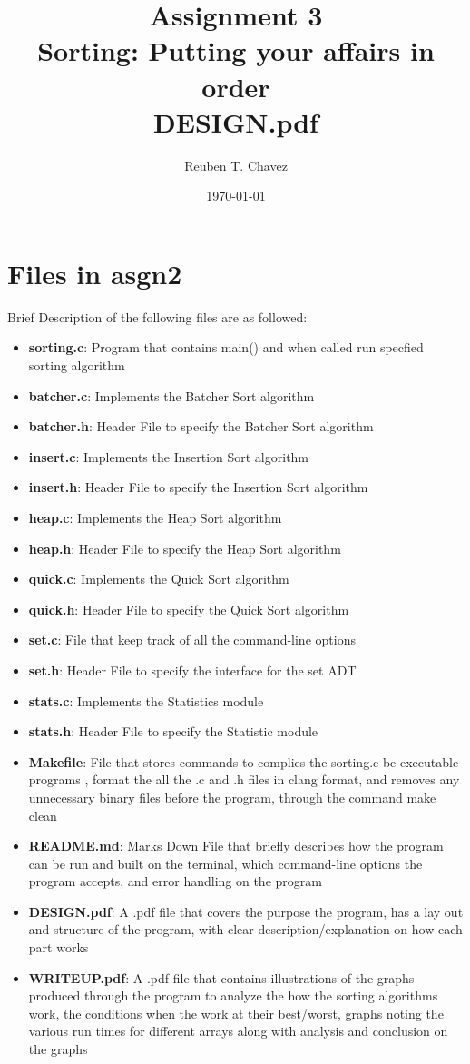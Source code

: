 \documentclass[11pt]{article} %
\title{Assignment 3 \\
    \large Sorting: Putting your affairs in order \\
    \textbf{ DESIGN.pdf}}
\author{Reuben T. Chavez}
\date{\today} %
\begin{document}
\maketitle %

\pagebreak
\section*{Files in asgn2} 

Brief Description of the following files are as followed:

\begin{itemize}
  \item \textbf{sorting.c}: Program that contains main() and when called run specfied sorting algorithm 
  \item \textbf{batcher.c}: Implements the Batcher Sort algorithm
  \item \textbf{batcher.h}: Header File to specify the Batcher Sort algorithm
  \item \textbf{insert.c}: Implements the Insertion Sort algorithm
  \item \textbf{insert.h}: Header File to specify the Insertion Sort algorithm
  \item \textbf{heap.c}: Implements the Heap Sort algorithm
  \item \textbf{heap.h}: Header File to specify the Heap Sort algorithm
  \item \textbf{quick.c}: Implements the Quick  Sort algorithm
  \item \textbf{quick.h}: Header File to specify the Quick Sort algorithm
  \item \textbf{set.c}: File that keep track of all the command-line options 
  \item \textbf{set.h}: Header File to specify the interface for the set ADT
  \item \textbf{stats.c}: Implements the Statistics module
  \item \textbf{stats.h}: Header File to specify the Statistic module
  \item \textbf{Makefile}: File that stores commands to complies the sorting.c be executable programs , format the all the .c and .h files in clang format, and removes any unnecessary binary files before the program, through the command make clean
  \item \textbf{README.md}: Marks Down File that briefly describes how the program can be run and built on the terminal, which command-line options the program accepts, and error handling on the program
  \item \textbf{DESIGN.pdf}: A .pdf file that covers the purpose the program, has a lay out and structure of the program, with clear description/explanation on how each part works
  \item \textbf{WRITEUP.pdf}: A .pdf file that contains illustrations of the graphs produced through the program to analyze the how the sorting algorithms work, the conditions when the work at their best/worst, graphs noting the various run times for different arrays along with analysis and conclusion on the graphs
\end{itemize}
\end{document}
